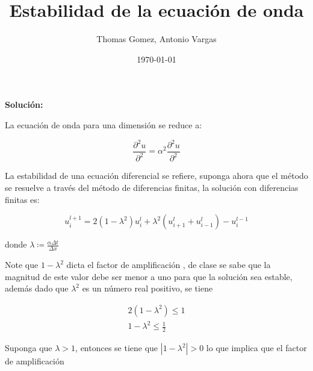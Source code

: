 \documentclass[10pt,a4paper]{article}
\begin{document}
	
	
	\title{Estabilidad de la ecuación de onda}
	\author{Thomas Gomez, Antonio Vargas}
	\date{\today}
	\maketitle

\textbf{Solución:}

La ecuación de onda para una dimensión se reduce a:

\begin{equation}
\frac{\partial^2 u}{\partial^2} = \alpha^2 \frac{\partial^2 u}{\partial^2	}
\end{equation}

La estabilidad de una ecuación diferencial se refiere, suponga ahora que el método se resuelve a través del método de diferencias finitas, la solución con diferencias finitas es:

\begin{equation}
u_{i}^{l+1} = 2(1-\lambda^2)u_i^l + \lambda^2(u_{i+1}^l + u_{i-1}^l) - u_i^{l-1} 
\end{equation}

donde $\lambda \coloneq \frac{\alpha \Delta t}{\Delta x}$

Note que $1-\lambda^2$ dicta el factor de amplificación , de clase se sabe que la magnitud de este valor debe ser menor a uno para que la solución sea estable, además dado que $\lambda^2$ es un número real positivo, se tiene

\begin{equation}
\begin{gathered}
2(1 - \lambda^2 ) \leq 1 \\
1 - \lambda^2 \leq \frac{1}{2}
\end{gathered}
\end{equation}

Suponga que $\lambda > 1$, entonces se tiene que $|1-\lambda^2| > 0 $ lo que implica que el factor de amplificación
\end{document}
